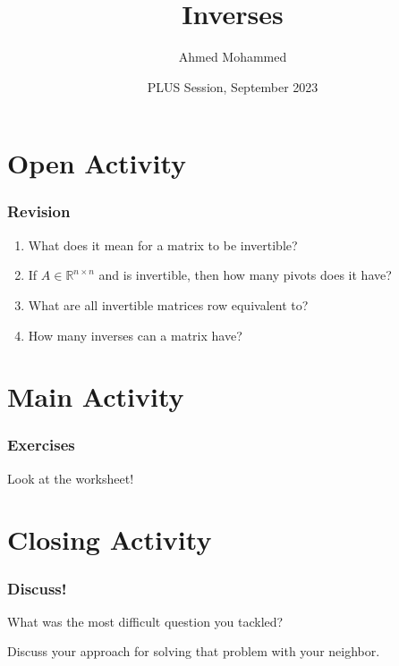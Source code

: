 \documentclass{beamer}
\title{Inverses}
\author{Ahmed Mohammed}
\institute{Georgia Institute of Technology}
\date{PLUS Session, September 2023}
\begin{document}
	\begin{frame}
		\maketitle
	\end{frame}

	\section{Open Activity}
	\begin{frame}
		\frametitle{Revision}
		\begin{enumerate}[<+(1)->]
			\item What does it mean for a matrix to be invertible?
			\item If \(A \in \mathbb{R}^{n \times n}\) and is invertible, then how many pivots does it have?
			\item What are all invertible matrices row equivalent to?
			\item How many inverses can a matrix have?
		\end{enumerate}
	\end{frame}

	\section{Main Activity}
	\begin{frame}
		\frametitle{Exercises}
		\centering Look at the worksheet!
	\end{frame}

	\section{Closing Activity}
	\begin{frame}
		\frametitle{Discuss!}
		What was the most difficult question you tackled? \pause

		Discuss your approach for solving that problem with your neighbor.
	\end{frame}
\end{document}
